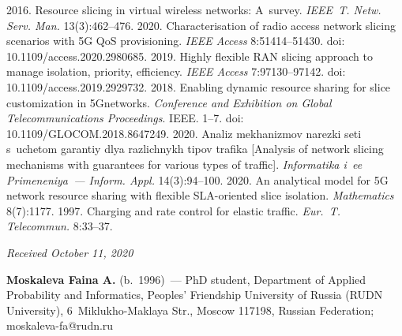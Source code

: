 \begin{multicols}{2}
{{\begin{thebibliography}{99}
 2016. Resource slicing in virtual 
wireless networks: A~survey. \textit{IEEE~T. Netw. Serv. Man.} 13(3):462--476.
 2020. 
Characterisation of radio access network slicing scenarios with 5G QoS provisioning. \textit{IEEE Access} 
8:51414--51430. doi: 10.1109/\mbox{access}.2020.2980685.
 2019. Highly flexible RAN slicing approach to manage 
isolation, priority, efficiency. \textit{IEEE Access} 7:97130--97142. doi: 
10.1109/\linebreak access.2019.2929732.
 2018. Enabling dynamic resource sharing for slice 
customization in 5G\linebreak networks. \textit{Conference and Exhibition on Global Tele\-communications 
Proceedings}. IEEE. 1--7. doi: 10.1109/\linebreak GLOCOM.2018.8647249.
 2020. 
Analiz mekhanizmov narezki seti s~uchetom garantiy dlya razlichnykh tipov trafika [Analysis of network 
slicing mechanisms with guarantees for various types of traffic]. \textit{Informatika i~ee 
Primeneniya~--- Inform. Appl.} 14(3):94--100.
 2020. An analytical model 
for 5G network resource sharing with flexible SLA-oriented slice isolation. \textit{Mathematics} 
8(7):1177.
 1997. Charging and rate control for elastic traffic. \textit{Eur.~T. Telecommun.} 
8:33--37.
\end{thebibliography}

 }
 }

\end{multicols}

\vspace*{-3pt}

\hfill{\small\textit{Received October 11, 2020}}




\Contr

\noindent
\textbf{Moskaleva Faina A.} (b.\ 1996)~--- PhD student, Department of Applied Probability and 
Informatics, Peoples' Friendship University of Russia (RUDN University), 6~Miklukho-Maklaya Str., 
Moscow 117198, Russian Federation; \mbox{moskaleva-fa@rudn.ru}

